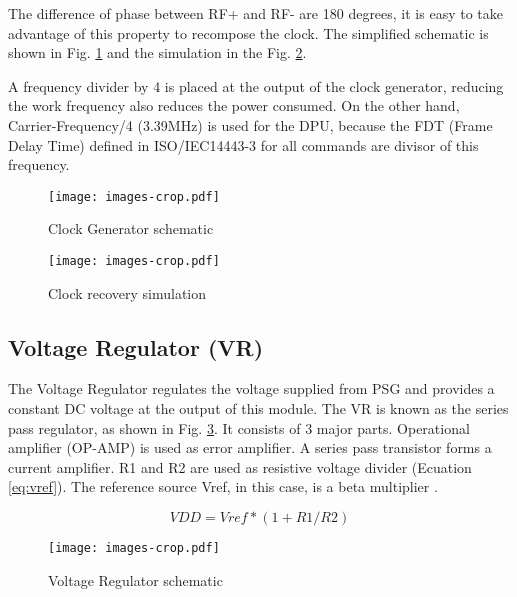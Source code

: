 The difference of phase between RF+ and RF- are 180 degrees, it is easy to take advantage of this property to recompose the clock. The simplified schematic is shown in Fig. \ref{fig:clk} and the simulation in the Fig. \ref{fig:clk_sim}.

A frequency divider by 4 is placed at the output of the clock generator, reducing the work frequency also reduces the power consumed. On the other hand, Carrier-Frequency/4 (3.39MHz) is used for the DPU, because the FDT (Frame Delay Time)  defined in ISO/IEC14443-3 for all commands are divisor of this frequency.
 

\begin{figure}[]
  \centering
  \texttt{[image: images-crop.pdf]}
  \caption{Clock Generator schematic}
  \label{fig:clk}
\end{figure}

\begin{figure}[]
  \centering
  \texttt{[image: images-crop.pdf]}
  \caption{Clock recovery simulation}
  \label{fig:clk_sim}
\end{figure}

\subsection{Voltage Regulator (VR)}

The Voltage Regulator \cite{rfid_ldo} regulates the voltage supplied from PSG and provides a constant DC voltage at the output of this module. The VR is known as the series pass regulator, as shown in Fig. \ref{fig:ldo}. It consists of 3 major parts. Operational amplifier (OP-AMP) is used as error amplifier. A series pass transistor forms a current amplifier. R1 and R2 are used as resistive voltage divider (Ecuation \ref{eq:vref}). The reference source Vref, in this case, is a beta multiplier \cite{panadero}. 

\begin{equation} \label{eq:vref}
VDD = Vref*(1+R1/R2)
\end{equation}


\begin{figure}[]
  \centering
  \texttt{[image: images-crop.pdf]}
  \caption{Voltage Regulator schematic}
  \label{fig:ldo}
\end{figure}

